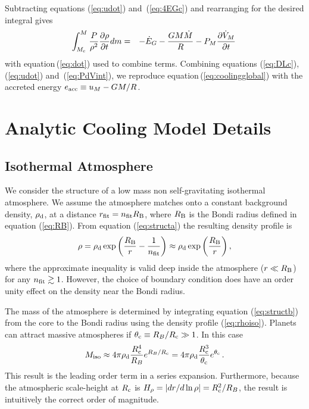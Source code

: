 \documentclass[apj]{emulateapj}
\newcommand{\p}{\partial}
\newcommand{\Eq}[1]{equation\,(\ref{#1})}
\newcommand{\Eqs}[2]{equations (\ref{#1}) and~(\ref{#2})}
\newcommand{\Eqsss}[3]{equations (\ref{#1}), (\ref{#2}) and~(\ref{#3})}
\newcommand{\RB}{R_{\rm B}}
\newcommand{\co}{_{\rm c}}
\newcommand{\di}{_{\rm d}}
\newcommand{\surf}{_M}
\begin{document}
Subtracting \Eqs{eq:udot}{eq:4EGc} and rearranging for the desired integral gives
\begin{eqnarray}\label{eq:PdVint}
\int_{M\co}^M {P \over \rho^2} {\p \rho \over \p t} dm  &=&  - \dot{E}_G - {G M \dot{M} \over R} - P\surf {\p \dot{V}\surf \over \p t} \,  
\end{eqnarray} 
with \Eq{eq:dot} used to combine terms.  Combining \Eqsss{eq:DLc}{eq:udot}{eq:PdVint}, we reproduce \Eq{eq:coolingglobal} with the accreted energy $e_{\rm acc} \equiv u\surf - GM/R$.  




\section{Analytic Cooling Model Details}\label{sec:analytic}

\subsection{Isothermal Atmosphere}
\label{iso}

We consider the structure of a low mass non self-gravitating isothermal atmosphere.  We assume the atmosphere matches onto a constant background density, $\rho_{\rm d}$, at a distance $r_{\rm fit} = n_{\rm fit} \RB$, where $R_{\rm B}$ is the Bondi radius defined in equation (\ref{eq:RB}). From equation (\ref{eq:structa}) the resulting density profile is
\begin{equation} \label{eq:rhoiso}
\rho = \rho_{\rm d} \exp \left({R_{\rm B} \over r} - {1 \over n_{\rm{fit}}} \right) \approx   \rho_{\rm{d}} \exp \left(R_{\rm B} \over r  \right),
\end{equation} 
where the approximate inequality is valid deep inside the atmosphere ($r \ll \RB$) for any $n_{\rm fit} \gtrsim 1$.  However, the choice of boundary condition does have an order unity effect on the density near the Bondi radius. 

The mass of the atmosphere is determined by integrating equation (\ref{eq:structb}) from the core to the Bondi radius using the density profile (\ref{eq:rhoiso}).  Planets can attract massive atmospheres if $\theta\co \equiv R_B/R\co \gg 1$.  In this case
\begin{equation} \label{eq:MatmISO}
M_{\rm iso} \approx 4 \pi \rho\di {R\co^4 \over R_B} e^{R_B/R\co} = 4 \pi \rho\di {R\co^3 \over \theta\co} e^{\theta\co}\, .
\end{equation} 
This result is the leading order term in a series expansion.  Furthermore, because the atmospheric scale-height at $R\co$ is $H_\rho = |dr /d\ln\rho| = R\co^2/R_B$, the result is intuitively the correct order of magnitude.
\end{document}
